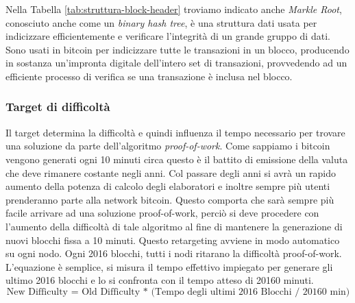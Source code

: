 Nella Tabella \ref{tab:struttura-block-header} troviamo indicato anche \textit{Markle Root}, conosciuto anche come un \textit{binary hash tree}, è una struttura dati usata per indicizzare efficientemente e verificare l’integrità di un grande gruppo di dati. Sono usati in bitcoin per indicizzare tutte le transazioni in un blocco, producendo in sostanza un’impronta digitale dell’intero set di transazioni, provvedendo ad un efficiente processo di verifica se una transazione è inclusa nel blocco. 

\subsubsection{Target di difficoltà}
Il target determina la difficoltà e quindi influenza il tempo necessario per trovare una soluzione da parte dell'algoritmo \textit{proof-of-work}. Come sappiamo i bitcoin vengono generati ogni 10 minuti circa questo è il battito di emissione della valuta che deve rimanere costante negli anni. Col passare degli anni si avrà un rapido aumento della potenza di calcolo degli elaboratori e inoltre sempre più utenti prenderanno parte alla network bitcoin. Questo comporta che sarà sempre più facile arrivare ad una soluzione proof-of-work, perciò si deve procedere con l'aumento della difficoltà di tale algoritmo al fine di mantenere la generazione di nuovi blocchi fissa a 10 minuti. Questo retargeting avviene in modo automatico su ogni nodo. Ogni 2016 blocchi, tutti i nodi ritarano la difficoltà proof-of-work. L'equazione è semplice, si misura il tempo effettivo impiegato per generare gli ultimo 2016 blocchi e lo si confronta con il tempo atteso di 20160 minuti. 
\[ \text{New Difficulty = Old Difficulty * (Tempo degli ultimi 2016 Blocchi / 20160 min)} \]

